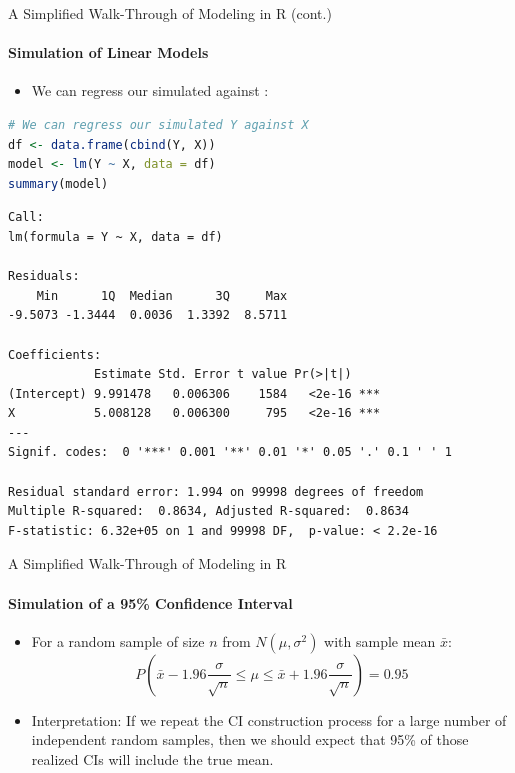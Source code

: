 \begin{frame}[fragile]{A Simplified Walk-Through of Modeling in R (cont.)}
\framesubtitle{Simulation of Linear Models}
\begin{itemize}
  \item We can regress our simulated  against :
\end{itemize}
\begin{lstlisting}[language=R]
# We can regress our simulated Y against X
df <- data.frame(cbind(Y, X))
model <- lm(Y ~ X, data = df)
summary(model)
\end{lstlisting}
\begin{lstlisting}[style=output,basicstyle=\ttfamily\tiny\color{black!75}]
Call:
lm(formula = Y ~ X, data = df)

Residuals:
    Min      1Q  Median      3Q     Max 
-9.5073 -1.3444  0.0036  1.3392  8.5711 

Coefficients:
            Estimate Std. Error t value Pr(>|t|)    
(Intercept) 9.991478   0.006306    1584   <2e-16 ***
X           5.008128   0.006300     795   <2e-16 ***
---
Signif. codes:  0 '***' 0.001 '**' 0.01 '*' 0.05 '.' 0.1 ' ' 1

Residual standard error: 1.994 on 99998 degrees of freedom
Multiple R-squared:  0.8634, Adjusted R-squared:  0.8634 
F-statistic: 6.32e+05 on 1 and 99998 DF,  p-value: < 2.2e-16
\end{lstlisting}
\end{frame}

\begin{frame}{A Simplified Walk-Through of Modeling in R}
\framesubtitle{Simulation of a 95\% Confidence Interval}
\begin{itemize}
  \item For a random sample of size $n$ from $N(\mu, \sigma^2)$ with sample mean $\bar{x}$:
  \[
    P\left(\bar{x} - 1.96 \frac{\sigma}{\sqrt{n}} \le \mu \le \bar{x} + 1.96 \frac{\sigma}{\sqrt{n}}\right) = 0.95
  \]
  \item Interpretation: If we repeat the CI construction process for a large number of independent random samples, then we should expect that 95\% of those realized CIs will include the true mean.
\end{itemize}
\end{frame}

